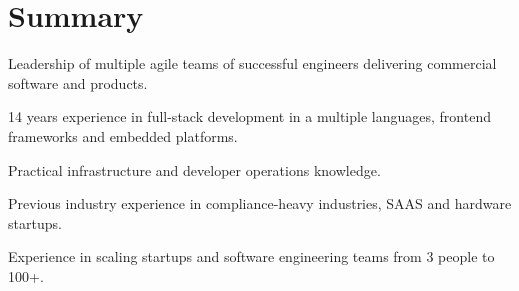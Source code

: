\documentclass[]{tjd-cv}
\begin{document}
%
%
\lastupdated

%
%

\begin{minipage}[t]{1\textwidth}
\section{Summary}
\vspace{\topsep}
\normalfont
\normalsize
\begin{tightemize}
\item Leadership of multiple agile teams of successful engineers delivering commercial software and products.
\item 14 years experience in full-stack development in a multiple languages, frontend frameworks and embedded platforms.
\item Practical infrastructure and developer operations knowledge.
\item Previous industry experience in compliance-heavy industries, SAAS and hardware startups.
\item Experience in scaling startups and software engineering teams from 3 people to 100+.
\end{tightemize}
\end{minipage}

\hspace{0pt}

%
%
\end{document}
